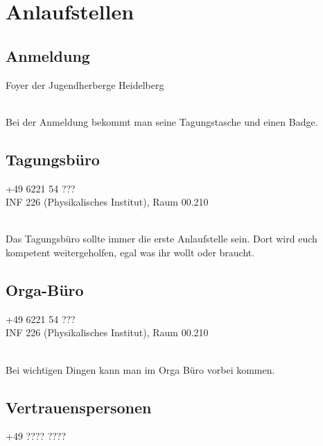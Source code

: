 
\section{Anlaufstellen}

\subsection{Anmeldung}
\faMapPin \quad Foyer der Jugendherberge Heidelberg\\
\faClockO \quad \\  %

\noindent Bei der Anmeldung bekommt man seine Tagungstasche und einen Badge. %

\subsection{Tagungsbüro}
\faPhone \quad +49 6221 54 ???\\ 
\faMapPin \quad INF 226 (Physikalisches Institut), Raum 00.210\\ %
\faClockO \quad \\  %

\noindent Das Tagungsbüro sollte immer die erste Anlaufstelle sein. Dort wird euch kompetent weitergeholfen, egal was ihr wollt oder braucht.

\subsection{Orga-Büro}
\faPhone \quad +49 6221 54 ???\\ 
\faMapPin \quad INF 226 (Physikalisches Institut), Raum 00.210\\
\faClockO \quad \\  %

\noindent Bei wichtigen Dingen kann man im Orga Büro vorbei kommen. %

\subsection{Vertrauenspersonen}
\faPhone \quad +49 ???? ????\\  %
\faUsers \quad \\ 

\noindent {}
